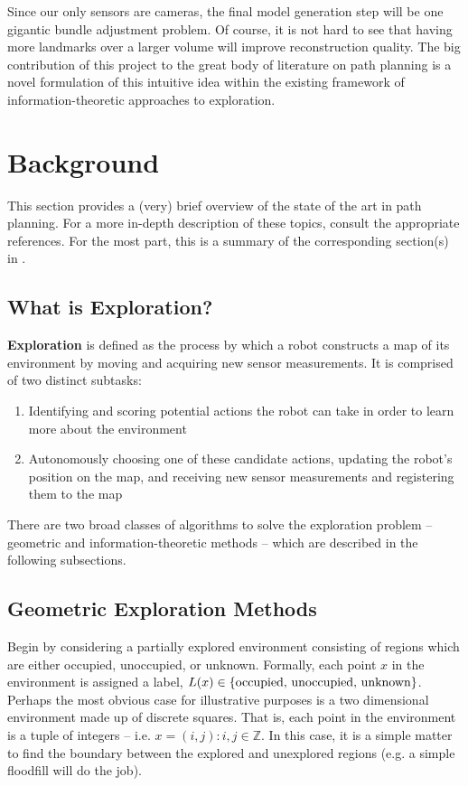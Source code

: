 \documentclass[12pt]{article}
\begin{document}
Since our only sensors are cameras, the final model generation step will be one gigantic bundle adjustment problem. Of course, it is not hard to see that having more landmarks over a larger volume will improve reconstruction quality. The big contribution of this project to the great body of literature on path planning is a novel formulation of this intuitive idea within the existing framework of information-theoretic approaches to exploration.

\section{Background}

This section provides a (very) brief overview of the state of the art in path planning. For a more in-depth description of these topics, consult the appropriate references. For the most part, this is a summary of the corresponding section(s) in \cite{erik}.

\subsection{What is Exploration?}

\textbf{Exploration} is defined as the process by which a robot constructs a map of its environment by moving and acquiring new sensor measurements. It is comprised of two distinct subtasks:
\begin{enumerate}
\item Identifying and scoring potential actions the robot can take in order to learn more about the environment
\item Autonomously choosing one of these candidate actions, updating the robot's position on the map, and receiving new sensor measurements and registering them to the map
\end{enumerate}

There are two broad classes of algorithms to solve the exploration problem -- geometric and information-theoretic methods -- which are described in the following subsections.

\subsection{Geometric Exploration Methods}

Begin by considering a partially explored environment consisting of regions which are either occupied, unoccupied, or unknown. Formally, each point $x$ in the environment is assigned a label, $L(x) \in \{\textnormal{occupied, unoccupied, unknown}\}$. Perhaps the most obvious case for illustrative purposes is a two dimensional environment made up of discrete squares. That is, each point in the environment is a tuple of integers -- i.e. $x = (i, j) : i,j \in \mathbb{Z}$. In this case, it is a simple matter to find the boundary between the explored and unexplored regions (e.g. a simple floodfill will do the job).
\end{document}
